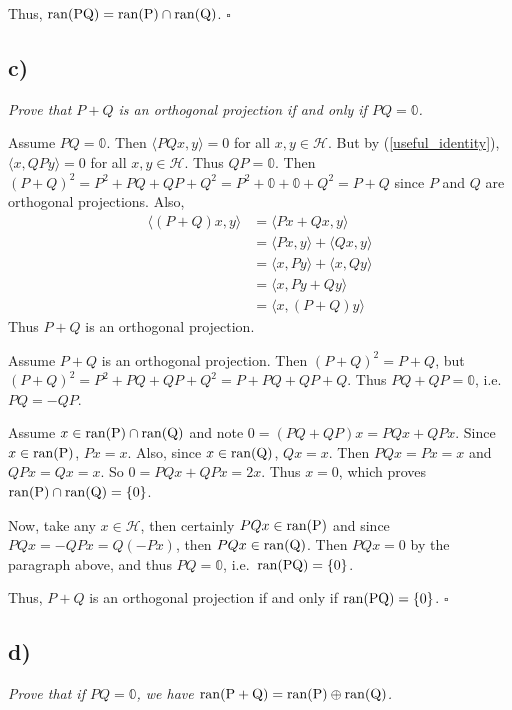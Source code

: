 \documentclass[12pt]{article}
\theoremstyle{plain}
\begin{document}
Thus, $\rm{ran}(PQ) = \rm{ran}(P)\cap\rm{ran}(Q)$. \hfill $\square$

\subsection*{ c)}
\emph{Prove that $P + Q$ is an orthogonal projection if and only if $PQ = \mathbb{0}$.} \medskip

Assume $PQ = \mathbb{0}$.  Then $\langle PQx, y \rangle = 0$ for all $x,y \in \mathcal{H}$.  But by (\ref{useful_identity}), $\langle x, QPy \rangle = 0$ for all $x,y \in \mathcal{H}$.  Thus $QP = \mathbb{0}$.  Then $(P + Q)^2 = P^2 + PQ + QP + Q^2 = P^2 + \mathbb{0} + \mathbb{0} + Q^2 = P + Q$ since $P$ and $Q$ are orthogonal projections.  Also,
\begin{align*}
    \langle (P + Q)x, y \rangle &= \langle Px + Qx, y\rangle \\
    &= \langle Px, y\rangle + \langle Qx, y\rangle \\
    &= \langle x, Py\rangle + \langle x, Qy\rangle \\
    &= \langle x, Py + Qy\rangle \\
    &= \langle x, (P + Q)y\rangle
\end{align*}
Thus $P + Q$ is an orthogonal projection. \medskip

Assume $P + Q$ is an orthogonal projection.  Then $(P + Q)^2 = P + Q$, but $(P + Q)^2 = P^2 + PQ + QP + Q^2 = P + PQ + QP + Q$.  Thus $PQ + QP = \mathbb{0}$, i.e.~$PQ = -QP$. \medskip

Assume $x \in \rm{ran}(P)\cap\rm{ran}(Q)$ and note $0 = (PQ + QP)x = PQx + QPx$.  Since $x \in \rm{ran}(P)$, $Px = x$.  Also, since $x \in \rm{ran}(Q)$, $Qx = x$.  Then $PQx = Px = x$ and $QPx = Qx = x$.  So $0 = PQx + QPx = 2x$.  Thus $x = 0$, which proves $\rm{ran}(P)\cap\rm{ran}(Q) = \{0\}$. \medskip

Now, take any $x \in \mathcal{H}$, then certainly $PQx \in \rm{ran}(P)$ and since $PQx = -QPx = Q(-Px)$, then $PQx \in \rm{ran}(Q)$.  Then $PQx = 0$ by the paragraph above, and thus $PQ = \mathbb{0}$, i.e.~$\rm{ran}(PQ) = \{0\}$. \medskip

Thus, $P + Q$ is an orthogonal projection if and only if $\rm{ran}(PQ) = \{0\}$.  \hfill $\square$

\subsection*{ d)}
\emph{Prove that if $PQ = \mathbb{0}$, we have $\rm{ran}(P+Q) = \rm{ran}(P) \oplus \rm{ran}(Q)$.} \medskip
\end{document}

